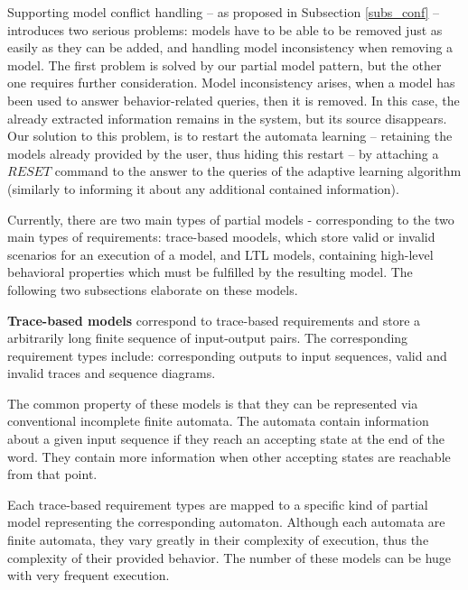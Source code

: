 Supporting model conflict handling -- as proposed in Subsection \ref{subs_conf} -- introduces two serious problems: models have to be able to be removed just as easily as they can be added, and handling model inconsistency when removing a model. The first problem is solved by our partial model pattern, but the other one requires further consideration. Model inconsistency arises, when a model has been used to answer behavior-related queries, then it is removed. In this case, the already extracted information remains in the system, but its source disappears. Our solution to this problem, is to restart the automata learning -- retaining the models already provided by the user, thus hiding this restart -- by attaching a $RESET$ command to the answer to the queries of the adaptive learning algorithm (similarly to informing it about any additional contained information).

Currently, there are two main types of partial models - corresponding to the two main types of requirements: trace-based moodels, which store valid or invalid scenarios for an execution of a model, and LTL models, containing high-level behavioral properties which must be fulfilled by the resulting model. The following two subsections elaborate on these models. 


\textbf{Trace-based models} correspond to trace-based requirements and store a arbitrarily long finite sequence of input-output pairs. The corresponding requirement types include: corresponding outputs to input sequences, valid and invalid traces and sequence diagrams. 

The common property of these models is that they can be represented via conventional incomplete finite automata. The automata contain information about a given input sequence if they reach an accepting state at the end of the word. They contain more information when other accepting states are reachable from that point.

Each trace-based requirement types are mapped to a specific kind of partial model representing the corresponding automaton. Although each automata are finite automata, they vary greatly in their complexity of execution, thus the complexity of their provided behavior. The number of these models can be huge with very frequent execution.

